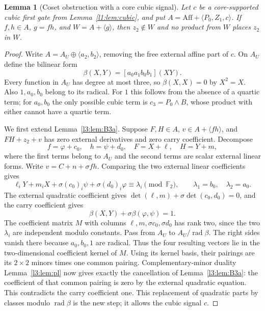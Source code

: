 \documentclass[11pt,a4paper]{article}
\theoremstyle{plain}
\newtheorem{lemma}[theorem]{Lemma}
\theoremstyle{remark}
\newcommand{\Aff}{\mathrm{Aff}}
\begin{document}
\begin{lemma}[Coset obstruction with a core cubic signal]\label{l1:lem:corecoset}
Let $c$ be a core-supported cubic first gate from Lemma~\ref{l1:lem:cubic}, and put $A=\Aff+\langle P_0,Z_1,c\rangle$. If $f,h\in A$, $g=fh$, and $W=A+\langle g\rangle$, then $z_2\notin W$ and no product from $W$ places $z_2$ in $W$.
\end{lemma}
\begin{proof}
Write $A=A_U\oplus\langle a_2,b_2\rangle$, removing the free external affine part of $c$. On $A_U$ define the bilinear form
\[
\beta(X,Y)=[a_0a_1b_0b_1](XY).
\]
Every function in $A_U$ has degree at most three, so $\beta(X,X)=0$ by $X^2=X$. Also $1,a_0,b_0$ belong to its radical. For $1$ this follows from the absence of a quartic term; for $a_0,b_0$ the only possible cubic term is $c_3=P_0\wedge B$, whose product with either cannot have a quartic term.

We first extend Lemma~\ref{l3:lem:B3a}. Suppose $F,H\in A$, $v\in A+\langle fh\rangle$, and $FH+z_2+v$ has zero external derivatives and zero carry coefficient. Decompose
\[
f=\varphi+c_0,\quad h=\psi+d_0,\quad F=X+\ell,\quad H=Y+m,
\]
where the first terms belong to $A_U$ and the second terms are scalar external linear forms. Write $v=C+n+\sigma fh$. Comparing the two external linear coefficients gives
\[
\ell_iY+m_iX+\sigma(c_0)_i\psi+\sigma(d_0)_i\varphi
\equiv\lambda_i\pmod{\mathbb F_2},\qquad
\lambda_1=b_0,\quad\lambda_2=a_0.
\]
The external quadratic coefficient gives $\det(\ell,m)+\sigma\det(c_0,d_0)=0$, and the carry coefficient gives
\[
\beta(X,Y)+\sigma\beta(\varphi,\psi)=1.
\]
The coefficient matrix $M$ with columns $\ell,m,\sigma c_0,\sigma d_0$ has rank two, since the two $\lambda_i$ are independent modulo constants. Pass from $A_U$ to $A_U/\operatorname{rad}\beta$. The right sides vanish there because $a_0,b_0,1$ are radical. Thus the four resulting vectors lie in the two-dimensional coefficient kernel of $M$. Using its kernel basis, their pairings are its $2\times2$ minors times one common pairing. Complementary-minor duality Lemma~\ref{l3:lem:pl} now gives exactly the cancellation of Lemma~\ref{l3:lem:B3a}: the coefficient of that common pairing is zero by the external quadratic equation. This contradicts the carry coefficient one. This replacement of quadratic parts by classes modulo $\operatorname{rad}\beta$ is the new step; it allows the cubic signal $c$.


\end{proof}
\end{document}
